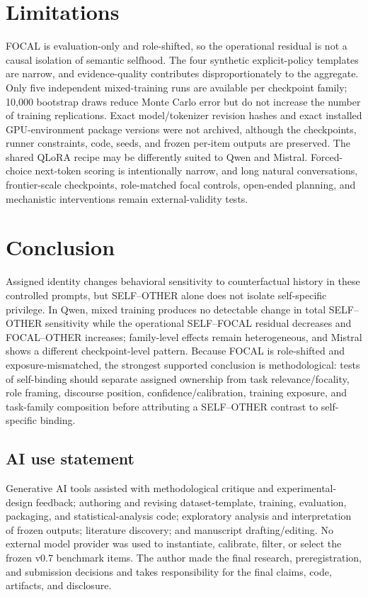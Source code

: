 \documentclass{article}
\begin{document}
\section{Limitations}

FOCAL is evaluation-only and role-shifted, so the operational residual is not a causal isolation of semantic selfhood. The four synthetic explicit-policy templates are narrow, and evidence-quality contributes disproportionately to the aggregate. Only five independent mixed-training runs are available per checkpoint family; 10,000 bootstrap draws reduce Monte Carlo error but do not increase the number of training replications. Exact model/tokenizer revision hashes and exact installed GPU-environment package versions were not archived, although the checkpoints, runner constraints, code, seeds, and frozen per-item outputs are preserved. The shared QLoRA recipe may be differently suited to Qwen and Mistral. Forced-choice next-token scoring is intentionally narrow, and long natural conversations, frontier-scale checkpoints, role-matched focal controls, open-ended planning, and mechanistic interventions remain external-validity tests.

\section{Conclusion}

Assigned identity changes behavioral sensitivity to counterfactual history in these controlled prompts, but SELF--OTHER alone does not isolate self-specific privilege. In Qwen, mixed training produces no detectable change in total SELF--OTHER sensitivity while the operational SELF--FOCAL residual decreases and FOCAL--OTHER increases; family-level effects remain heterogeneous, and Mistral shows a different checkpoint-level pattern. Because FOCAL is role-shifted and exposure-mismatched, the strongest supported conclusion is methodological: tests of self-binding should separate assigned ownership from task relevance/focality, role framing, discourse position, confidence/calibration, training exposure, and task-family composition before attributing a SELF--OTHER contrast to self-specific binding.

\subsection*{AI use statement}

Generative AI tools assisted with methodological critique and experimental-design feedback; authoring and revising dataset-template, training, evaluation, packaging, and statistical-analysis code; exploratory analysis and interpretation of frozen outputs; literature discovery; and manuscript drafting/editing. No external model provider was used to instantiate, calibrate, filter, or select the frozen v0.7 benchmark items. The author made the final research, preregistration, and submission decisions and takes responsibility for the final claims, code, artifacts, and disclosure.
\end{document}
